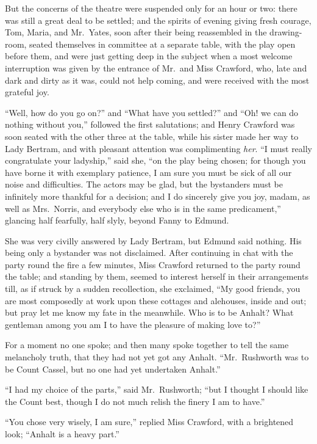 \documentclass{article}
\begin{document}
But the concerns of the theatre were suspended only for an
hour or two:  there was still a great deal to be settled;
and the spirits of evening giving fresh courage, Tom, Maria,
and Mr.\ Yates, soon after their being reassembled
in the drawing-room, seated themselves in committee
at a separate table, with the play open before them,
and were just getting deep in the subject when a most
welcome interruption was given by the entrance of Mr.\ and
Miss Crawford, who, late and dark and dirty as it was,
could not help coming, and were received with the most grateful
joy.

``Well, how do you go on?'' and ``What have you settled?''
and ``Oh! we can do nothing without you,'' followed the
first salutations; and Henry Crawford was soon seated
with the other three at the table, while his sister made
her way to Lady Bertram, and with pleasant attention
was complimenting \emph{her}.  ``I must really congratulate
your ladyship,'' said she, ``on the play being chosen;
for though you have borne it with exemplary patience, I am
sure you must be sick of all our noise and difficulties.
The actors may be glad, but the bystanders must be infinitely
more thankful for a decision; and I do sincerely give
you joy, madam, as well as Mrs.\ Norris, and everybody else
who is in the same predicament,'' glancing half fearfully,
half slyly, beyond Fanny to Edmund.

She was very civilly answered by Lady Bertram,
but Edmund said nothing.  His being only a bystander was
not disclaimed.  After continuing in chat with the party
round the fire a few minutes, Miss Crawford returned
to the party round the table; and standing by them,
seemed to interest herself in their arrangements till,
as if struck by a sudden recollection, she exclaimed,
``My good friends, you are most composedly at work upon
these cottages and alehouses, inside and out; but pray let
me know my fate in the meanwhile.  Who is to be Anhalt?
What gentleman among you am I to have the pleasure of making
love to?''

For a moment no one spoke; and then many spoke together
to tell the same melancholy truth, that they had not yet
got any Anhalt.  ``Mr.\ Rushworth was to be Count Cassel,
but no one had yet undertaken Anhalt.''

``I had my choice of the parts,'' said Mr.\ Rushworth;
``but I thought I should like the Count best, though I do
not much relish the finery I am to have.''

``You chose very wisely, I am sure,'' replied Miss Crawford,
with a brightened look; ``Anhalt is a heavy part.''
\end{document}
